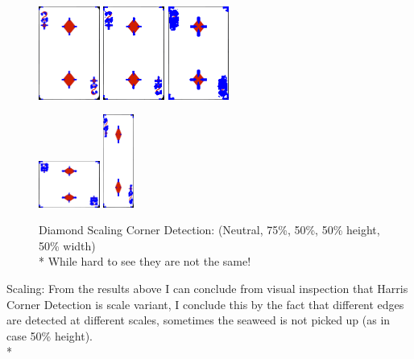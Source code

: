 \documentclass[conference]{IEEEtran}
\begin{document}
\begin{figure}[H]
    \centerline{
        {\includegraphics[width=20mm, scale=0.5]{./figures/Harris Corner/diamondNeutral Corners.png}}
        {\includegraphics[width=20mm, scale=0.5]{./figures/Harris Corner/diamond75 Corners.png}}
        {\includegraphics[width=20mm, scale=0.5]{./figures/Harris Corner/diamond50 Corners.png}}
    }
    \centerline{
        {\includegraphics[width=20mm, scale=0.5]{./figures/Harris Corner/diamondheightReduced Corners.png}}
        {\includegraphics[width=10mm, scale=0.5]{./figures/Harris Corner/diamondwidthReduced Corners.png}}
    }
    \caption{Diamond Scaling Corner Detection: (Neutral, 75\%, 50\%, 50\% height, 50\% width)\\*
    While hard to see they are not the same!}
    \label{fig}
\end{figure}
Scaling:
From the results above I can conclude from visual inspection that Harris Corner Detection is scale variant, I conclude this by the fact that different edges are detected at different scales, sometimes the seaweed is not picked up (as in case 50\% height).
\\*
\end{document}
